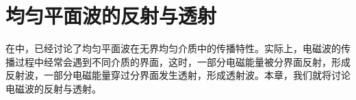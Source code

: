 \chapter{均匀平面波的反射与透射}
在中，已经讨论了均匀平面波在无界均匀介质中的传播特性。实际上，电磁波的传播过程中经常会遇到不同介质的界面，这时，一部分电磁能量被分界面反射，形成反射波，一部分电磁能量穿过分界面发生透射，形成透射波。本章，我们就将讨论电磁波的反射与透射。

